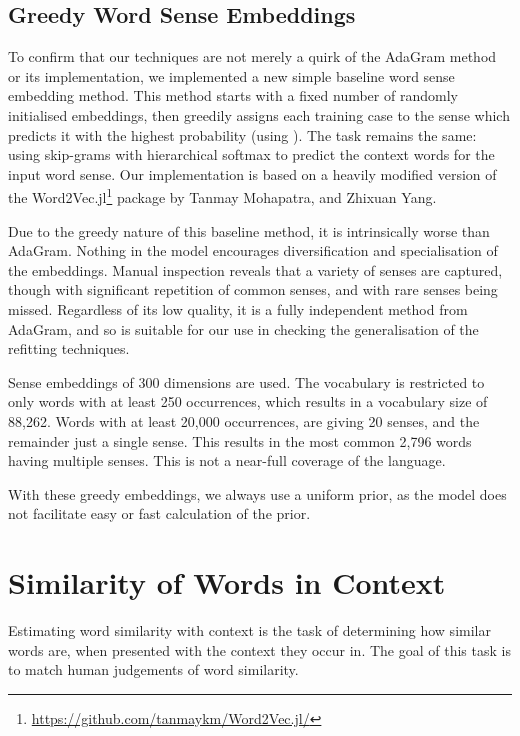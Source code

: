 \documentclass{article}
\begin{document}
\subsection{Greedy Word Sense Embeddings}

To confirm that our techniques are not merely a quirk of the AdaGram method or its implementation, we implemented a new simple baseline word sense embedding method.
This method starts with a fixed number of randomly initialised embeddings, then greedily assigns each training case to the sense which predicts it with the highest probability (using ).
The task remains the same: using skip-grams with hierarchical softmax to predict the context words for the input word sense.
Our implementation is based on a heavily modified version of the Word2Vec.jl\footnote{\url{https://github.com/tanmaykm/Word2Vec.jl/}} package by Tanmay Mohapatra, and Zhixuan Yang.

Due to the greedy nature of this baseline method, it is intrinsically worse than AdaGram.
Nothing in the model encourages diversification and specialisation of the embeddings.
Manual inspection reveals that a variety of senses are captured, though with significant repetition of common senses, and with rare senses being missed.
Regardless of its low quality, it is a fully independent method from AdaGram, and so is suitable for our use in checking the generalisation of the refitting techniques.

Sense embeddings of 300 dimensions are used.
The vocabulary is restricted to only words with at least 250 occurrences, which results in a vocabulary size of 88,262. Words with at least 20,000 occurrences, are giving 20 senses, and the remainder just a single sense.
This results in the most common 2,796 words having multiple senses.
This is not a near-full coverage of the language. 

With these greedy embeddings, we always use a uniform prior, as the model does not facilitate easy or fast calculation of the prior.



\section{Similarity of Words in Context} \label{SimilarityInContext}
Estimating word similarity with context is the task of determining how similar words are, when presented with the context they occur in.
The goal of this task is to match human judgements of word similarity.
\end{document}
